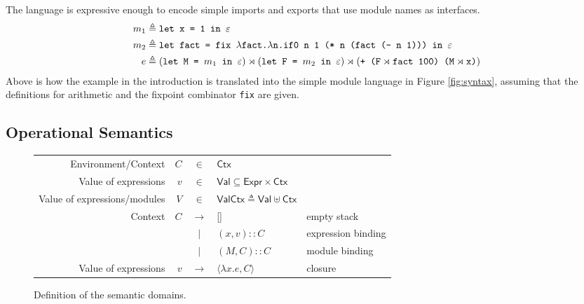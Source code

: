 \documentclass[acmsmall,screen,review]{acmart}\settopmatter{printfolios=true,printccs=false,printacmref=false}
\newcommand*{\vbar}{|}
\newcommand*{\cons}{::}
\newcommand*{\Expr}{\mathsf{Expr}}
\newcommand*{\Ctx}{\mathsf{Ctx}}
\newcommand*{\Value}{\mathsf{Val}}
\newcommand*{\synlink}{\rtimes}
\begin{document}
The language is expressive enough to encode simple imports and exports that use module names as interfaces.
\begin{align*}
  m_1 & \triangleq\text{\texttt{let x = 1 in }}\varepsilon                                                                                                                                                                                     \\
  m_2 & \triangleq\text{\texttt{let fact = fix }}\lambda\text{\texttt{fact.}}\lambda\text{\texttt{n.if0 n 1 (* n (fact (- n 1))) in }}\varepsilon                                                                                              \\
  e   & \triangleq(\text{\texttt{let M = }}m_1\text{\texttt{ in }}\varepsilon)\synlink(\text{\texttt{let F = }}m_2\text{\texttt{ in }}\varepsilon)\synlink(\text{\texttt{+ (F}}\synlink\text{\texttt{fact 100) (M}}\synlink\text{\texttt{x)}})
\end{align*}
Above is how the example in the introduction is translated into the simple module language in Figure \ref{fig:syntax}, assuming that the definitions for arithmetic and the fixpoint combinator \texttt{fix} are given.

\subsection{Operational Semantics}
\begin{figure}[h!]
  \footnotesize
  \centering
  \begin{tabular}{rrcll}
    Environment/Context          & $C$ & $\in$         & $\Ctx$                                                      \\
    Value of expressions         & $v$ & $\in$         & $\Value \subseteq \Expr\times\Ctx$                          \\
    Value of expressions/modules & $V$ & $\in$         & $\Value\Ctx\triangleq\Value\uplus\Ctx$                      \\
    Context                      & $C$ & $\rightarrow$ & []                                     & empty stack        \\
                                 &     & $\vbar$       & $(x,v)\cons C$                         & expression binding \\
                                 &     & $\vbar$       & $(M,C)\cons C$                         & module binding     \\
    Value of expressions         & $v$ & $\rightarrow$ & $\langle \lambda x.e, C \rangle$       & closure
  \end{tabular}
  \caption{Definition of the semantic domains.}
  \label{fig:simpdom}
\end{figure}
\end{document}
